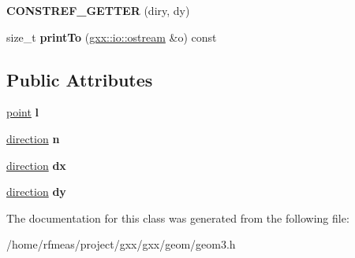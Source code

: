 \begin{DoxyCompactItemize}
\item 
{\bfseries C\+O\+N\+S\+T\+R\+E\+F\+\_\+\+G\+E\+T\+T\+ER} (diry, dy)\hypertarget{classgxx_1_1geom3_1_1axis2_a8a39a8b8e3f47ab9f77804fecd070608}{}\label{classgxx_1_1geom3_1_1axis2_a8a39a8b8e3f47ab9f77804fecd070608}

\item 
size\+\_\+t {\bfseries print\+To} (\hyperlink{classgxx_1_1io_1_1ostream}{gxx\+::io\+::ostream} \&o) const \hypertarget{classgxx_1_1geom3_1_1axis2_a1a7d141a3bd974d93b0e34551aac43fd}{}\label{classgxx_1_1geom3_1_1axis2_a1a7d141a3bd974d93b0e34551aac43fd}

\end{DoxyCompactItemize}
\subsection*{Public Attributes}
\begin{DoxyCompactItemize}
\item 
\hyperlink{classgxx_1_1geom3_1_1point}{point} {\bfseries l}\hypertarget{classgxx_1_1geom3_1_1axis2_a8b647f744b39e87341c39ed50c7b04a8}{}\label{classgxx_1_1geom3_1_1axis2_a8b647f744b39e87341c39ed50c7b04a8}

\item 
\hyperlink{classgxx_1_1geom3_1_1direction}{direction} {\bfseries n}\hypertarget{classgxx_1_1geom3_1_1axis2_aad35f7babab12fe7ca80a1e9ff10ce25}{}\label{classgxx_1_1geom3_1_1axis2_aad35f7babab12fe7ca80a1e9ff10ce25}

\item 
\hyperlink{classgxx_1_1geom3_1_1direction}{direction} {\bfseries dx}\hypertarget{classgxx_1_1geom3_1_1axis2_a854199c278119e5f5ff3391bee1cd1cc}{}\label{classgxx_1_1geom3_1_1axis2_a854199c278119e5f5ff3391bee1cd1cc}

\item 
\hyperlink{classgxx_1_1geom3_1_1direction}{direction} {\bfseries dy}\hypertarget{classgxx_1_1geom3_1_1axis2_a9a3f95b98ae9aba91bb3cd50b9668a27}{}\label{classgxx_1_1geom3_1_1axis2_a9a3f95b98ae9aba91bb3cd50b9668a27}

\end{DoxyCompactItemize}


The documentation for this class was generated from the following file\+:\begin{DoxyCompactItemize}
\item 
/home/rfmeas/project/gxx/gxx/geom/geom3.\+h\end{DoxyCompactItemize}
